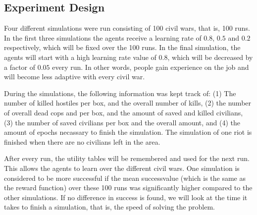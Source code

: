 \subsection{Experiment Design}
Four different simulations were run consisting of 100 civil wars, that is, 100 runs. In the first three simulations the agents receive a learning rate of $0.8$, $0.5$ and $0.2$ respectively, which will be fixed over the 100 runs. In the final simulation, the agents will start with a high learning rate value of $0.8$, which will be decreased by a factor of $0.05$ every run. In other words, people gain experience on the job and will become less adaptive with every civil war.

During the simulations, the following information was kept track of: (1) The number of killed hostiles per box, and the overall number of kills, (2) the number of overall dead cops and per box, and the amount of saved and killed civilians, (3) the number of saved civilians per box and the overall amount, and (4) the amount of epochs necassary to finish the simulation. The simulation of one riot is finished when there are no civilians left in the area.
 
After every run, the utility tables will be remembered and used for the next run. This allows the agents to learn over the different civil wars. One simulation is considered to be more successful if the mean successvalue (which is the same as the reward function) over these 100 runs was significantly higher compared to the other simulations. If no difference in success is found, we will look at the time it takes to finish a simulation, that is, the speed of solving the problem. 
